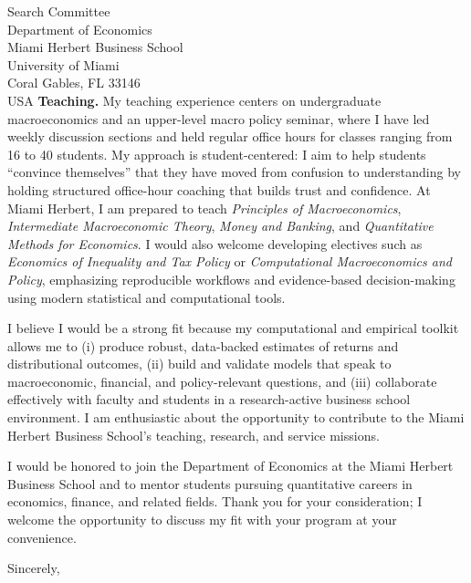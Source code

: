 \documentclass[11pt,letterpaper]{letter}
\begin{document}
\begin{letter}{Search Committee \\
Department of Economics \\
Miami Herbert Business School \\
University of Miami \\
Coral Gables, FL 33146 \\ USA}
\textbf{Teaching.} My teaching experience centers on undergraduate macroeconomics and an upper-level macro policy seminar, where I have led weekly discussion sections and held regular office hours for classes ranging from 16 to 40 students. My approach is student-centered: I aim to help students “convince themselves” that they have moved from confusion to understanding by holding structured office-hour coaching that builds trust and confidence. At Miami Herbert, I am prepared to teach \textit{Principles of Macroeconomics}, \textit{Intermediate Macroeconomic Theory}, \textit{Money and Banking}, and \textit{Quantitative Methods for Economics}. I would also welcome developing electives such as \textit{Economics of Inequality and Tax Policy} or \textit{Computational Macroeconomics and Policy}, emphasizing reproducible workflows and evidence-based decision-making using modern statistical and computational tools.

I believe I would be a strong fit because my computational and empirical toolkit allows me to (i) produce robust, data-backed estimates of returns and distributional outcomes, (ii) build and validate models that speak to macroeconomic, financial, and policy-relevant questions, and (iii) collaborate effectively with faculty and students in a research-active business school environment. I am enthusiastic about the opportunity to contribute to the Miami Herbert Business School’s teaching, research, and service missions.

I would be honored to join the Department of Economics at the Miami Herbert Business School and to mentor students pursuing quantitative careers in economics, finance, and related fields. Thank you for your consideration; I welcome the opportunity to discuss my fit with your program at your convenience.

\closing{Sincerely,}

\end{letter}
\end{document}
